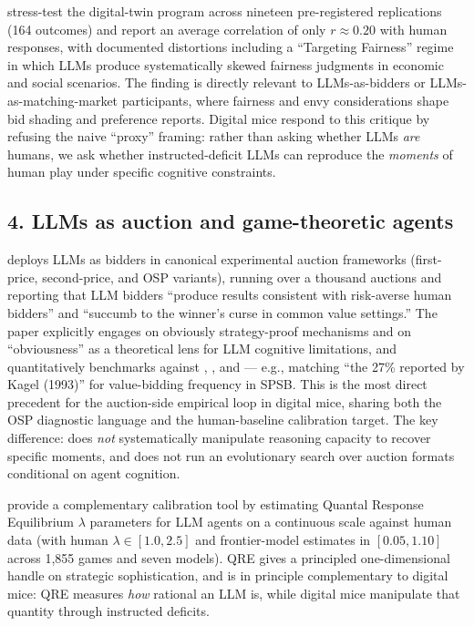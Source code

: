 \citet{peng2025funhouse} stress-test the digital-twin program across
nineteen pre-registered replications (164 outcomes) and report an
average correlation of only $r \approx 0.20$ with human responses, with
documented distortions including a ``Targeting Fairness'' regime in
which LLMs produce systematically skewed fairness judgments in
economic and social scenarios. The finding is directly relevant to
LLMs-as-bidders or LLMs-as-matching-market participants, where
fairness and envy considerations shape bid shading and preference
reports. Digital mice respond to this critique by refusing the naive
``proxy'' framing: rather than asking whether LLMs \emph{are} humans,
we ask whether instructed-deficit LLMs can reproduce the
\emph{moments} of human play under specific cognitive constraints.

\subsection*{4. LLMs as auction and game-theoretic agents}

\citet{shah2025synthetic} deploys LLMs as bidders in canonical
experimental auction frameworks (first-price, second-price, and OSP
variants), running over a thousand auctions and reporting that LLM
bidders ``produce results consistent with risk-averse human bidders''
and ``succumb to the winner's curse in common value settings.'' The
paper explicitly engages \citet{li2017osp} on obviously strategy-proof
mechanisms and \citet{breitmoser2022obviousness} on ``obviousness'' as
a theoretical lens for LLM cognitive limitations, and quantitatively
benchmarks against \citet{coppinger1980incentives},
\citet{cox1988theory}, and \citet{kagel1993independent} --- e.g.,
matching ``the 27\% reported by Kagel (1993)'' for value-bidding
frequency in SPSB. This is the most direct precedent for the
auction-side empirical loop in digital mice, sharing both the OSP
diagnostic language and the human-baseline calibration target. The
key difference: \citet{shah2025synthetic} does \emph{not} systematically
manipulate reasoning capacity to recover specific moments, and does not
run an evolutionary search over auction formats conditional on agent
cognition.

\citet{pechon2026qre} provide a complementary calibration tool by
estimating Quantal Response Equilibrium $\lambda$ parameters for LLM
agents on a continuous scale against human data (with human
$\lambda \in [1.0, 2.5]$ and frontier-model estimates in
$[0.05, 1.10]$ across 1{,}855 games and seven models). QRE gives a
principled one-dimensional handle on strategic sophistication, and is
in principle complementary to digital mice: QRE measures
\emph{how} rational an LLM is, while digital mice manipulate that
quantity through instructed deficits.

